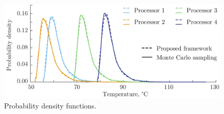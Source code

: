\begin{figure}
  \centering
  \includegraphics[width=1.0\linewidth]{include/assets/experimental-results-pdf.pdf}
  \vspace{-0.5em}
  \caption{Probability density functions.}
  \vspace{-1.0em}
\end{figure}
